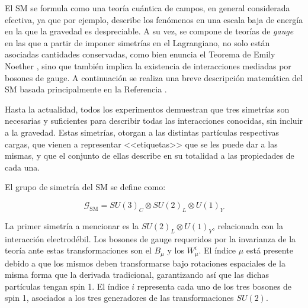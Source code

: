El SM se formula como una teoría cuántica de campos, en general considerada efectiva, ya que por ejemplo, describe los fenómenos en una escala baja de energía en la que la gravedad es despreciable. A su vez, se compone de teorías de \textit{gauge} en las que a partir de imponer simetrías en el Lagrangiano, no solo están asociadas cantidades conservadas, como bien enuncia el Teorema de Emily Noether \cite{Noether1918}, sino que también implica la existencia de interacciones mediadas por bosones de gauge. A continuación se realiza una breve descripción matemática del SM basada principalmente en la Referencia \cite{gkane}.

Hasta la actualidad, todos los experimentos demuestran que tres simetrías son necesarias y suficientes para describir todas las interacciones conocidas, sin incluir a la gravedad. Estas simetrías, otorgan a las distintas partículas respectivas cargas, que vienen a representar <<etiquetas>> que se les puede dar a las mismas, y que el conjunto de ellas describe en su totalidad a las propiedades de cada una.

El grupo de simetría del SM se define como:

\begin{equation}
	\mathcal{G}_{\text{SM}} = SU(3)_C \otimes SU(2)_L \otimes U(1)_Y
\end{equation}

La primer simetría a mencionar es la $SU(2)_L \otimes U(1)_Y$, relacionada con la interacción electrodébil. Los bosones de gauge requeridos por la invarianza de la teoría ante estas transformaciones son el $B_{\mu}$ y los $W_{\mu}^{i}$. El índice $\mu$ está presente debido a que los mismos deben transformarse bajo rotaciones espaciales de la misma forma que la derivada tradicional, garantizando así que las dichas partículas tengan spin 1. El índice $i$ representa cada uno de los tres bosones de spin 1, asociados a los tres generadores de las transformaciones $SU(2)$.


